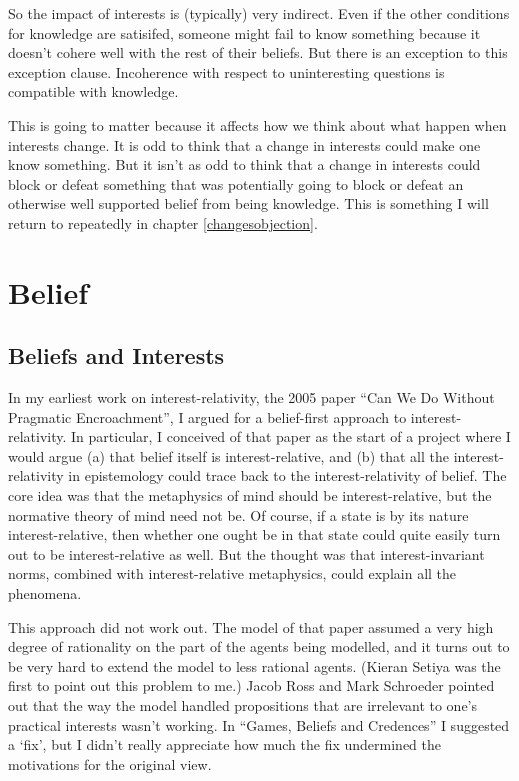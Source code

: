 \documentclass[11pt,]{book}
\begin{document}
So the impact of interests is (typically) very indirect. Even if the other conditions for knowledge are satisifed, someone might fail to know something because it doesn't cohere well with the rest of their beliefs. But there is an exception to this exception clause. Incoherence with respect to uninteresting questions is compatible with knowledge.

This is going to matter because it affects how we think about what happen when interests change. It is odd to think that a change in interests could make one know something. But it isn't as odd to think that a change in interests could block or defeat something that was potentially going to block or defeat an otherwise well supported belief from being knowledge. This is something I will return to repeatedly in chapter \ref{changesobjection}.

\hypertarget{belief}{%
\chapter{Belief}\label{belief}}

\hypertarget{beliefsinterests}{%
\section{Beliefs and Interests}\label{beliefsinterests}}

In my earliest work on interest-relativity, the 2005 paper ``Can We Do Without Pragmatic Encroachment'', I argued for a belief-first approach to interest-relativity. In particular, I conceived of that paper as the start of a project where I would argue (a) that belief itself is interest-relative, and (b) that all the interest-relativity in epistemology could trace back to the interest-relativity of belief. The core idea was that the metaphysics of mind should be interest-relative, but the normative theory of mind need not be. Of course, if a state is by its nature interest-relative, then whether one ought be in that state could quite easily turn out to be interest-relative as well. But the thought was that interest-invariant norms, combined with interest-relative metaphysics, could explain all the phenomena.

This approach did not work out. The model of that paper assumed a very high degree of rationality on the part of the agents being modelled, and it turns out to be very hard to extend the model to less rational agents. (Kieran Setiya was the first to point out this problem to me.) Jacob Ross and Mark Schroeder \citeyearpar{RossSchroeder2014} pointed out that the way the model handled propositions that are irrelevant to one's practical interests wasn't working. In ``Games, Beliefs and Credences'' I suggested a `fix', but I didn't really appreciate how much the fix undermined the motivations for the original view.
\end{document}
